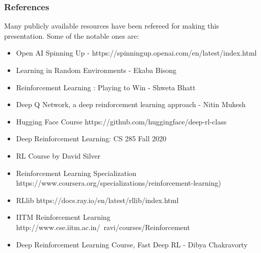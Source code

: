 \begin{frame}\frametitle{References}
Many publicly available resources have been refereed for making this presentation. Some of the notable ones are:
\footnotesize
\begin{itemize}
\item Open AI Spinning Up - https://spinningup.openai.com/en/latest/index.html
\item Learning in Random Environments - Ekaba Bisong
\item Reinforcement Learning : Playing to Win - Shweta Bhatt
\item Deep Q Network, a deep reinforcement learning approach - Nitin Mukesh
\item Hugging Face Course https://github.com/huggingface/deep-rl-class
\item Deep Reinforcement Learning: CS 285 Fall 2020
\item RL Course by David Silver
\item Reinforcement Learning Specialization https://www.coursera.org/specializations/reinforcement-learning)
\item RLlib https://docs.ray.io/en/latest/rllib/index.html
\item IITM Reinforcement Learning http://www.cse.iitm.ac.in/~ravi/courses/Reinforcement%
\item Deep Reinforcement Learning Course, Fast Deep RL - Dibya Chakravorty
\end{itemize}
\end{frame}
